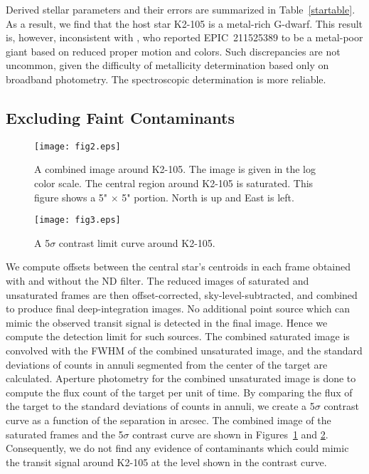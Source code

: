 \documentclass[]{pasj01}
\begin{document}
Derived stellar parameters and their errors are summarized in Table~\ref{startable}.
As a result, we find that the host star K2-105 is a metal-rich G-dwarf.
This result is, however, inconsistent with \citet{2016ApJS..224....2H},
who reported EPIC~211525389 to be a metal-poor giant based on reduced proper motion and colors.
Such discrepancies are not uncommon, given the difficulty of metallicity determination
based only on broadband photometry.
The spectroscopic determination is more reliable.

\subsection{Excluding Faint Contaminants}

	\begin{figure}[tp]
			\texttt{[image: fig2.eps]} 
			\caption{A combined image around K2-105. The image is given in the log color scale.
			The central region around K2-105 is saturated. This figure shows a 5" $\times$ 5" portion.
			North is up and East is left.
			\label{aoimaging}}
	\end{figure}

	\begin{figure}[tp]
			\texttt{[image: fig3.eps]} 
			\caption{A 5$\sigma$ contrast limit curve around K2-105.
			\label{contrastcurve}}
	\end{figure}

We compute offsets between the central star's centroids
in each frame obtained with and without the ND filter.
The reduced images of saturated and unsaturated frames are then offset-corrected,
sky-level-subtracted, and combined to produce final deep-integration images.
No additional point source which can mimic the observed transit signal is
detected in the final image.
Hence we compute the detection limit for such sources.
The combined saturated image is convolved with the FWHM of
the combined unsaturated image, and the standard deviations of
counts in annuli segmented from the center of the target are calculated.
Aperture photometry for the combined unsaturated image
is done to compute the flux count of the target per unit of time.
By comparing the flux of the target to the standard
deviations of counts in annuli, we create a 5$\sigma$ contrast curve
as a function of the separation in arcsec.
The combined image of the saturated frames and
the 5$\sigma$ contrast curve are shown in Figures~\ref{aoimaging} and \ref{contrastcurve}.
Consequently, we do not find any evidence of contaminants which
could mimic the transit signal around K2-105
at the level shown in the contrast curve.
\end{document}
